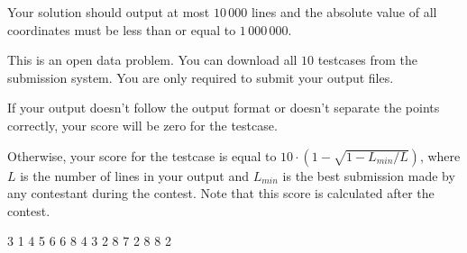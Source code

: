 Your solution should output at most $10\,000$ lines and the absolute value of all coordinates must be less than or equal to $1\,000\,000$.

This is an open data problem. You can download all $10$ testcases from the submission system. You are only required to submit your output files.

If your output doesn't follow the output format or doesn't separate the points correctly, your score will be zero for the testcase.

Otherwise, your score for the testcase is equal to
$ 10 \cdot \left(1 - \sqrt{1 - L_{min} / L}\right)$,
where $L$ is the number of lines in your output and $L_{min}$ is the best submission made by any contestant during the contest.
Note that this score is calculated after the contest.


3 1
4 5
6 6
8 4
3 2 8 7
2 8 8 2
\sampleEND

